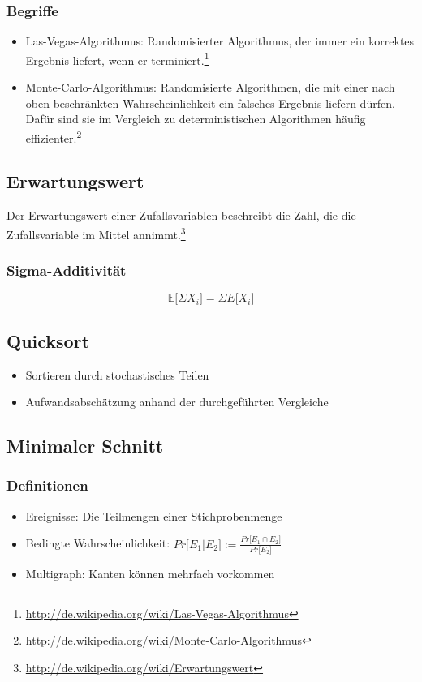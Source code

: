 \subsubsection{Begriffe}
\begin{itemize}
	\item Las-Vegas-Algorithmus: Randomisierter Algorithmus, der immer ein korrektes Ergebnis liefert, wenn er terminiert.\footnote{\url{http://de.wikipedia.org/wiki/Las-Vegas-Algorithmus}}
	\item Monte-Carlo-Algorithmus: Randomisierte Algorithmen, die mit einer nach oben beschränkten Wahrscheinlichkeit ein falsches Ergebnis liefern dürfen. Dafür sind sie im Vergleich zu deterministischen Algorithmen häufig effizienter.\footnote{\url{http://de.wikipedia.org/wiki/Monte-Carlo-Algorithmus}}
\end{itemize}

\subsection{Erwartungswert}
Der Erwartungswert einer Zufallsvariablen beschreibt die Zahl, die die Zufallsvariable im Mittel annimmt.\footnote{\url{http://de.wikipedia.org/wiki/Erwartungswert}}

\subsubsection{Sigma-Additivität}
\[\mathbb{E}\lbrack \Sigma X_i\rbrack = \Sigma E \lbrack X_i\rbrack\]


\subsection{Quicksort}
\begin{itemize}
	\item Sortieren durch stochastisches Teilen
	\item Aufwandsabschätzung anhand der durchgeführten Vergleiche
\end{itemize}



\subsection{Minimaler Schnitt}

\subsubsection{Definitionen}
\begin{itemize}
	\item Ereignisse: Die Teilmengen einer Stichprobenmenge
	\item Bedingte Wahrscheinlichkeit: \(Pr \lbrack E_1 | E_2 \rbrack := \frac{Pr\lbrack E_1 \cap E_2 \rbrack}{Pr\lbrack E_2 \rbrack} \)
	\item Multigraph: Kanten können mehrfach vorkommen
\end{itemize}

